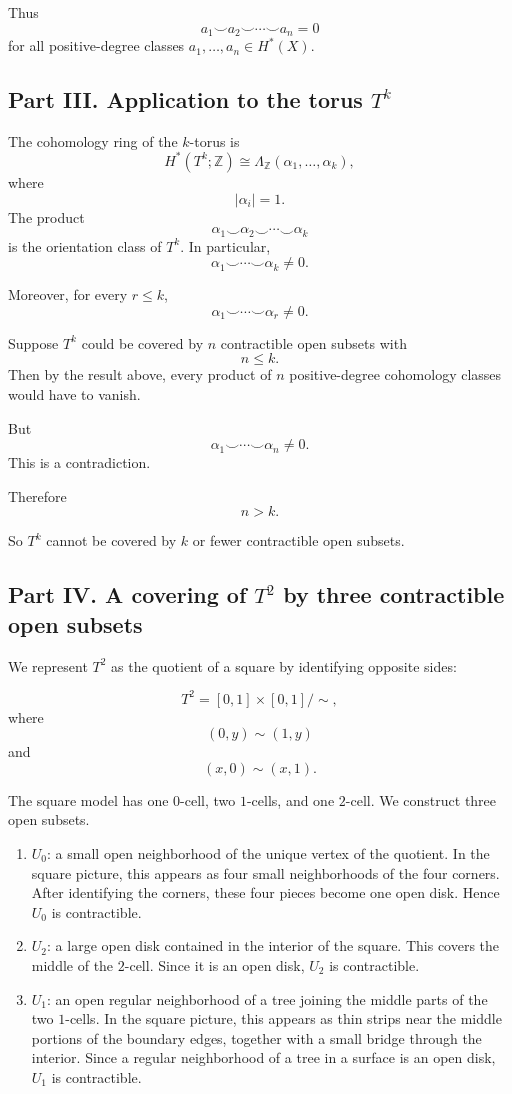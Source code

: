 \documentclass[12pt,a4paper]{article}
\theoremstyle{notespace}
\begin{document}
Thus
\[
\boxed{
	a_1\smile a_2\smile\cdots\smile a_n=0
}
\]
for all positive-degree classes \(a_1,\dots,a_n\in H^*(X)\).

\subsection*{Part III. Application to the torus \(T^k\)}

The cohomology ring of the \(k\)-torus is
\[
H^*(T^k;\mathbb Z)
\cong
\Lambda_{\mathbb Z}(\alpha_1,\dots,\alpha_k),
\]
where
\[
|\alpha_i|=1.
\]
The product
\[
\alpha_1\smile \alpha_2\smile\cdots\smile \alpha_k
\]
is the orientation class of \(T^k\). In particular,
\[
\alpha_1\smile \cdots\smile \alpha_k\neq 0.
\]

Moreover, for every \(r\leq k\),
\[
\alpha_1\smile\cdots\smile\alpha_r\neq 0.
\]

Suppose \(T^k\) could be covered by \(n\) contractible open subsets with
\[
n\leq k.
\]
Then by the result above, every product of \(n\) positive-degree cohomology classes would have to vanish.

But
\[
\alpha_1\smile\cdots\smile\alpha_n\neq 0.
\]
This is a contradiction.

Therefore
\[
\boxed{
	n>k.
}
\]

So \(T^k\) cannot be covered by \(k\) or fewer contractible open subsets.

\subsection*{Part IV. A covering of \(T^2\) by three contractible open subsets}

We represent \(T^2\) as the quotient of a square by identifying opposite sides:

\[
T^2
=
[0,1]\times[0,1]/\sim,
\]
where
\[
(0,y)\sim (1,y)
\]
and
\[
(x,0)\sim (x,1).
\]

The square model has one \(0\)-cell, two \(1\)-cells, and one \(2\)-cell. We construct three open subsets.

\begin{enumerate}
	\item \(U_0\): a small open neighborhood of the unique vertex of the quotient. In the square picture, this appears as four small neighborhoods of the four corners. After identifying the corners, these four pieces become one open disk. Hence \(U_0\) is contractible.
	
	\item \(U_2\): a large open disk contained in the interior of the square. This covers the middle of the \(2\)-cell. Since it is an open disk, \(U_2\) is contractible.
	
	\item \(U_1\): an open regular neighborhood of a tree joining the middle parts of the two \(1\)-cells. In the square picture, this appears as thin strips near the middle portions of the boundary edges, together with a small bridge through the interior. Since a regular neighborhood of a tree in a surface is an open disk, \(U_1\) is contractible.
\end{enumerate}
\end{document}
